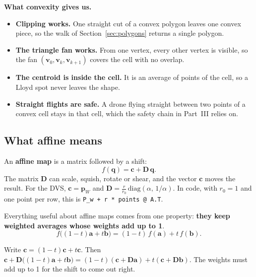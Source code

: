 \documentclass[11pt,a4paper]{article}
\newcommand{\vect}[1]{\mathbf{#1}}
\newcommand{\pW}{\vect{p}_W}
\begin{document}
\textbf{What convexity gives us.}
\begin{itemize}[leftmargin=*]
\item \textbf{Clipping works.} One straight cut of a convex polygon leaves one convex piece, so the walk of
Section~\ref{sec:polygons} returns a single polygon.
\item \textbf{The triangle fan works.} From one vertex, every other vertex is visible, so the fan
$(\vect{v}_0,\vect{v}_k,\vect{v}_{k+1})$ covers the cell with no overlap.
\item \textbf{The centroid is inside the cell.} It is an average of points of the cell, so a Lloyd spot never leaves
the shape.
\item \textbf{Straight flights are safe.} A drone flying straight between two points of a convex cell stays in that
cell, which the safety chain in Part~III relies on.
\end{itemize}

\subsection{What affine means}
An \textbf{affine map} is a matrix followed by a shift:
\[
f(\vect{q})=\vect{c}+\vect{D}\,\vect{q}.
\]
The matrix $\vect{D}$ can scale, squish, rotate or shear, and the vector $\vect{c}$ moves the result. For the DVS,
$\vect{c}=\pW$ and $\vect{D}=\tfrac{r}{r_0}\,\mathrm{diag}(\alpha,\,1/\alpha)$. In code, with $r_0=1$ and one point per
row, this is \texttt{P\_w + r * points @ A.T}.

Everything useful about affine maps comes from one property: \textbf{they keep weighted averages whose weights add up
to 1}.
\begin{equation}
f\big((1-t)\vect{a}+t\vect{b}\big)=(1-t)\,f(\vect{a})+t\,f(\vect{b}).\tag{$\ast$}\label{eq:affavg}
\end{equation}
\begin{whybox}
Write $\vect{c}=(1-t)\vect{c}+t\vect{c}$. Then
$\vect{c}+\vect{D}\big((1-t)\vect{a}+t\vect{b}\big)=(1-t)(\vect{c}+\vect{D}\vect{a})+t(\vect{c}+\vect{D}\vect{b})$.
The weights must add up to 1 for the shift to come out right.
\end{whybox}
\end{document}
